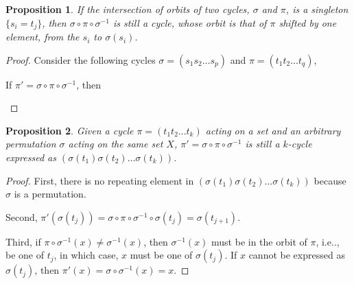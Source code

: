 \documentclass[12pt, letterpaper]{article}
\makeatletter
\newcommand\ie{i.e\@ifnextchar.{}{.\@}}
\newtheorem{prop}{Proposition}[section]
\theoremstyle{definition}
\theoremstyle{remark}
\theoremstyle{definition}
\theoremstyle{plain}
\numberwithin{equation}{section}
\makeatother
\begin{document}
	\begin{prop}\label{propCycleTransform}
		If the intersection of orbits of two cycles, $\sigma$ and $\pi$, is a singleton $\{s_i=t_j\}$,
		then $\sigma\circ\pi\circ\sigma^{-1}$ is still a cycle, whose orbit is that of $\pi$ shifted by one element,
		from the $s_i$ to $\sigma(s_i)$.
	\end{prop}
	\begin{proof}
		Consider the following cycles $\sigma=(s_1s_2\dots s_p)$ and $\pi=(t_1t_2\dots t_q)$,
		\begin{center}
		\end{center}
		If $\pi'=\sigma\circ\pi\circ\sigma^{-1}$, then
		\begin{center}
		\end{center}
	\end{proof}
	\begin{prop}\label{propSigmaPiSigma-1}
		Given a cycle $\pi=(t_1t_2\dots t_k)$ acting on a set
		and an arbitrary permutation $\sigma$ acting
		on the same set $X$,
		$\pi'=\sigma\circ\pi\circ\sigma^{-1}$ is still a $k$-cycle
		expressed as $(\sigma(t_1)\sigma(t_2)\dots \sigma(t_k))$.
	\end{prop}
	\begin{proof}
		
		
		First, there is no repeating element in $(\sigma(t_1)\sigma(t_2)\dots \sigma(t_k))$
		because $\sigma$ is a permutation.
		
		Second,
		$\pi'(\sigma(t_j))=\sigma\circ\pi\circ\sigma^{-1}\circ\sigma(t_j)=\sigma(t_{j+1})$.
		
		Third,
		if $\pi\circ\sigma^{-1}(x)\ne\sigma^{-1}(x)$,
		then $\sigma^{-1}(x)$ must be in the orbit of $\pi$, \ie, be one of $t_j$,
		in which case, $x$ must be one of $\sigma(t_j)$.
		If $x$ cannot be expressed as $\sigma(t_j)$,
		then $\pi'(x)=\sigma\circ\sigma^{-1}(x)=x$.
	\end{proof}
\end{document}
